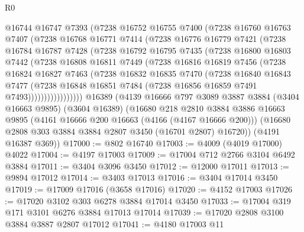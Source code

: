 \begin{lexlean}{R0}
\begin{coremodule}
          @16744
          @16747
          @7393
          (@7238
            @16752
            @16755
            @7400
            (@7238
              @16760
              @16763
              @7407
              (@7238
                @16768
                @16771
                @7414
                (@7238
                  @16776
                  @16779
                  @7421
                  (@7238
                    @16784
                    @16787
                    @7428
                    (@7238
                      @16792
                      @16795
                      @7435
                      (@7238
                        @16800
                        @16803
                        @7442
                        (@7238
                          @16808
                          @16811
                          @7449
                          (@7238
                            @16816
                            @16819
                            @7456
                            (@7238
                              @16824
                              @16827
                              @7463
                              (@7238
                                @16832
                                @16835
                                @7470
                                (@7238
                                  @16840
                                  @16843
                                  @7477
                                  (@7238
                                    @16848
                                    @16851
                                    @7484
                                    (@7238 @16856 @16859 @7491 @7493)))))))))))))))))
    @16389
    (@4139
      @16666
      @797
      @3089
      @3887
      @3884
      (@3404 @16663 @9895)
      (@3604 @16389)
      (@16680
        @218
        @2810
        @3884
        @3886
        @16663
        @9895
        (@4161 @16666 @200 @16663 (@4166 (@4167 @16666 @200)))
        (@16680 @2808 @303 @3884 @3884 @2807 @3450 (@16701 @2807) @16720))
      (@4191 @16387 @369))
@17000 := @802 @16740
@17003 := @4009 (@4019 @17000) @4022
@17004 := @4197 @17003
@17009 := @17004 @712 @2766 @3104 @6492 @3884
@17011 := @3404 @3096 @3450
@17012 := @12000 @17011
@17013 := @9894 @17012
@17014 := @3403 @17013
@17016 := @3404 @17014 @3450
@17019 := @17009 @17016 (@3658 @17016)
@17020 := @4152 @17003
@17026 := @17020 @3102 @303 @6278 @3884 @17014 @3450
@17033 := @17004 @319 @171 @3101 @6276 @3884 @17013 @17014
@17039 := @17020 @2808 @3100 @3884 @3887 @2807 @17012
@17041 := @4180 @17003 @11

\end{coremodule}
\end{lexlean}
